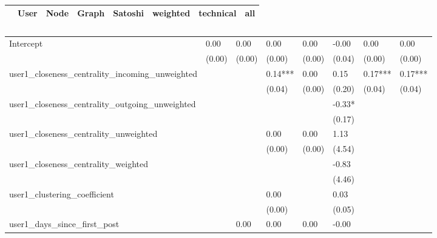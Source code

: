 \begin{table}
\caption{}
\begin{center}
\begin{tabular}{lccccccc}
\hline
                                               &   User  &   Node  &  Graph  & Satoshi &   weighted  & technical &   all    \\
\hline
\hline
\end{tabular}
\begin{tabular}{llllllll}
Intercept                                      & 0.00    & 0.00    & 0.00    & 0.00    & -0.00       & 0.00      & 0.00     \\
                                               & (0.00)  & (0.00)  & (0.00)  & (0.00)  & (0.04)      & (0.00)    & (0.00)   \\
user1_closeness_centrality_incoming_unweighted &         &         & 0.14*** & 0.00    & 0.15        & 0.17***   & 0.17***  \\
                                               &         &         & (0.04)  & (0.00)  & (0.20)      & (0.04)    & (0.04)   \\
user1_closeness_centrality_outgoing_unweighted &         &         &         &         & -0.33*      &           &          \\
                                               &         &         &         &         & (0.17)      &           &          \\
user1_closeness_centrality_unweighted          &         &         & 0.00    & 0.00    & 1.13        &           &          \\
                                               &         &         & (0.00)  & (0.00)  & (4.54)      &           &          \\
user1_closeness_centrality_weighted            &         &         &         &         & -0.83       &           &          \\
                                               &         &         &         &         & (4.46)      &           &          \\
user1_clustering_coefficient                   &         &         & 0.00    &         & 0.03        &           &          \\
                                               &         &         & (0.00)  &         & (0.05)      &           &          \\
user1_days_since_first_post                    &         & 0.00    & 0.00    & 0.00    & -0.00       &           &          \\

\end{tabular}
\end{center}
\end{table}
